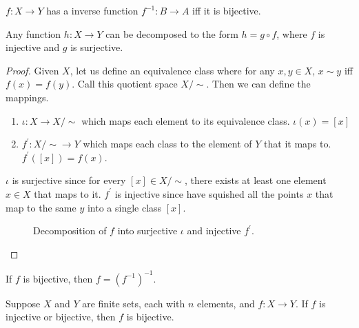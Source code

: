 \documentclass{article}
\begin{document}
    \begin{corollary}
      $f: X \rightarrow Y$ has a inverse function $f^{-1}: B \rightarrow A$ iff it is bijective. 
    \end{corollary}

    \begin{corollary}[Decomposition]
      Any function $h: X \rightarrow Y$ can be decomposed to the form $h = g \circ f$, where $f$ is injective and $g$ is surjective. 

    \end{corollary}
    \begin{proof}
      Given $X$, let us define an equivalence class where for any $x, y \in X$, $x \sim y$ iff $f(x) = f(y)$. Call this quotient space $X / \sim$. Then we can define the mappings. 
      \begin{enumerate}
        \item $\iota: X \rightarrow X / \sim$ which maps each element to its equivalence class. $\iota(x) = [x]$
        \item $f^\prime: X / \sim \rightarrow Y$ which maps each class to the element of $Y$ that it maps to. $f^\prime ([x]) = f(x)$. 
      \end{enumerate}
      $\iota$ is surjective since for every $[x] \in X / \sim$, there exists at least one element $x \in X$ that maps to it. $f^\prime$ is injective since have squished all the points $x$ that map to the same $y$ into a single class $[x]$. 

      \begin{figure}[H]
        \centering 
        \caption{Decomposition of $f$ into surjective $\iota$ and injective $f^\prime$. } 
        \label{fig:decomposition}
      \end{figure}
    \end{proof}

    \begin{theorem}
      If $f$ is bijective, then $f = (f^{-1})^{-1}$. 
    \end{theorem}

    \begin{theorem}
      Suppose $X$ and $Y$ are finite sets, each with $n$ elements, and $f: X \rightarrow Y$. If $f$ is injective or bijective, then $f$ is bijective. 
    \end{theorem} 
\end{document}
